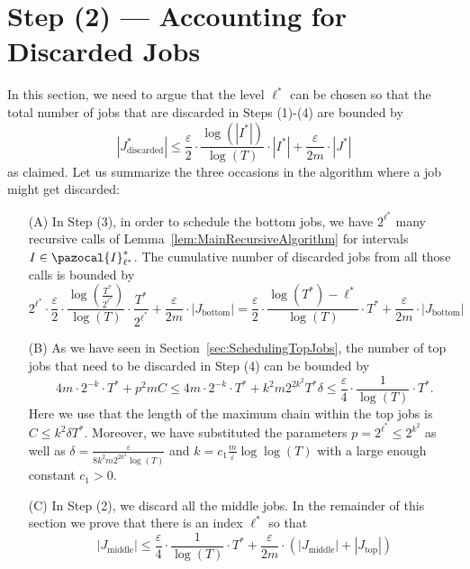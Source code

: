 \documentclass[11pt,letterpaper,oneside,english]{article}
\theoremstyle{theorem}
\begin{document}
\section{Step (2) --- Accounting for Discarded Jobs}\label{sec:AccountingDiscardedJobs}

In this section, we need to argue that the level $\ell^*$ can be chosen so that the total 
number of jobs that are discarded in Steps (1)-(4) are bounded by
\[
 |J_{\textrm{discarded}}^*| \leq \frac{\varepsilon}{2} \cdot \frac{\log (|I^*|)}{\log(T)} \cdot |I^*| + \frac{\varepsilon}{2m} \cdot |J^*|
\]
as claimed. 
Let us summarize the three occasions in the algorithm where a job might get discarded: 
\begin{enumerate}
\item[(A)] In Step (3), in order to schedule the bottom jobs, 
we have $2^{\ell^*}$ many recursive calls of Lemma~\ref{lem:MainRecursiveAlgorithm}
for intervals $I \in \pazocal{I}_{\ell^*}^*$. The cumulative number of discarded jobs from all those calls
is bounded by
\[
 2^{\ell^*} \cdot \frac{\varepsilon}{2} \cdot \frac{\log(\frac{T^*}{2^{\ell^*}})}{\log(T)} \cdot \frac{T^*}{2^{\ell^*}} + \frac{\varepsilon}{2m} \cdot |J_{\textrm{bottom}}| 
= \frac{\varepsilon}{2} \cdot \frac{\log(T^*)-\ell^*}{\log(T)} \cdot T^* + \frac{\varepsilon}{2m} \cdot |J_{\textrm{bottom}}|
\]
\item[(B)] As we have seen in Section~\ref{sec:SchedulingTopJobs}, the number of top jobs that 
need to be discarded in Step (4) can be bounded by \[
4m \cdot 2^{-k} \cdot T^* + p^2mC 
 \leq 4m \cdot 2^{-k} \cdot T^* + k^2 m2^{2k^2} T^* \delta 
\leq \frac{\varepsilon}{4} \cdot \frac{1}{\log(T)} \cdot T^*.
\]
Here we use that the length of the maximum chain within the top jobs is $C \leq k^2 \delta T^*$.
Moreover, we have substituted the parameters $p = 2^{\ell^*} \leq 2^{k^2}$
as well as  $\delta = \frac{\varepsilon}{8k^2 m2^{2k^2} \log(T)}$ and $k = c_1 \frac{m}{\varepsilon} \log \log(T)$ with a large enough constant $c_1>0$.
\item[(C)] In Step (2), we discard all the middle jobs. In the remainder of this section we prove 
that there is an index $\ell^*$ so that 
\[
   |J_{\textrm{middle}}| \leq \frac{\varepsilon}{4} \cdot \frac{1}{\log(T)} \cdot T^* + \frac{\varepsilon}{2m} \cdot (|J_{\textrm{middle}}| + |J_{\textrm{top}}|)
\]
\end{enumerate}
\end{document}
